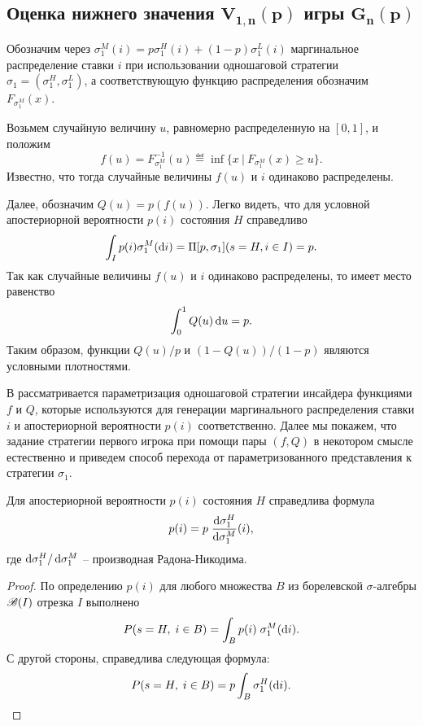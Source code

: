 {\subsection{Оценка нижнего значения $\mathbf{V_{1,n}(p)}$ игры $\mathbf{G_n(p)}$}
\label{ch2:sec:-primal-game}

Обозначим через $\sigma^M_1(i) = p \sigma^H_1(i) + (1-p) \sigma^L_1(i)$ маргинальное распределение ставки $i$ при использовании одношаговой стратегии $\sigma_1 = (\sigma^H_1, \sigma^L_1)$, а соответствующую функцию распределения обозначим $F_{\sigma^M_1}(x)$.

Возьмем случайную величину $u$, равномерно распределенную на $[0, 1]$, и положим
\begin{equation*}
  f(u) = F^{-1}_{\sigma^M_1}(u) \eqdef \inf \{ x\ |\ F_{\sigma^M_1}(x) \geq u \}.
\end{equation*}
Известно, что тогда случайные величины $f(u)$ и $i$ одинаково распределены.

Далее, обозначим $Q(u) = p(f(u))$.
Легко видеть, что для условной апостериорной вероятности $p(i)$ состояния $H$ справедливо
\begin{equation*}
  \int_I p(i) \sigma^M_1(\mathop{}\!\mathrm{d} i) = \Pi[p, \sigma_1](s = H, i \in I) = p.
\end{equation*}
Так как случайные величины $f(u)$ и $i$ одинаково распределены, то имеет место равенство
\begin{equation*}
  \int_0^1 Q(u) \mathop{}\!\mathrm{d} u = p.
\end{equation*}
Таким образом, функции $Q(u)/p$ и $(1-Q(u))/(1-p)$ являются условными плотностями.

В \cite{demeyer02} рассматривается параметризация одношаговой стратегии инсайдера функциями $f$ и $Q$, которые используются для генерации маргинального распределения ставки $i$ и апостериорной вероятности $p(i)$ соответственно.
Далее мы покажем, что задание стратегии первого игрока при помощи пары $(f, Q)$ в некотором смысле естественно и приведем способ перехода от параметризованного представления к стратегии $\sigma_1$.

\begin{proposition}
  Для апостериорной вероятности $p(i)$ состояния $H$ справедлива формула
  \begin{equation}\label{ch2:eq:p(i)}
    p(i) = p \; \frac{\mathop{}\!\mathrm{d} \sigma^H_1}{\mathop{}\!\mathrm{d} \sigma^M_1}(i),
  \end{equation}
  где $\mathop{}\!\mathrm{d} \sigma^H_1/\mathop{}\!\mathrm{d} \sigma^M_1$ -- производная Радона-Никодима.
\end{proposition}
\begin{proof}
  По определению $p(i)$ для любого множества $B$ из борелевской $\sigma$-алгебры $\mathscr{B}(I)$ отрезка $I$ выполнено
  \begin{equation*}
    P(s = H, \; i \in B) = \int_B p(i) \; \sigma^M_1(\mathop{}\!\mathrm{d} i).
  \end{equation*}
  С другой стороны, справедлива следующая формула:
  \begin{equation*}
    P(s = H, \; i \in B) = p \int_B \sigma^H_1(\mathop{}\!\mathrm{d} i).
  \end{equation*}


\end{proof}}
